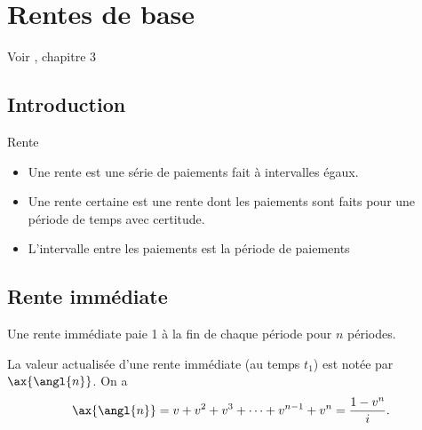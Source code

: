 \chapter{Rentes de base}
Voir \cite{kellison2006theory}, chapitre 3
\section{Introduction}

\begin{definition}{Rente}{}
	\begin{itemize}
		\item Une rente est une série de paiements fait à intervalles égaux. 
		\item Une rente certaine est une rente dont les paiements sont faits pour une période de temps avec certitude. 
		\item L'intervalle entre les paiements est la période de paiements
	\end{itemize}
\end{definition}

\section{Rente immédiate}

Une rente immédiate paie 1 à la fin de chaque période pour $n$ périodes. 

\begin{center}
\end{center}

La valeur actualisée d'une rente immédiate (au temps \textcolor{dlblue}{$t_1$}) est notée par $\ax{\angl{n}}$. On a 
$$\ax{\angl{n}} = v + v^2 + v^3 + \dots + v^{n-1} + v^n = \frac{1 - v^n}{i}.$$

